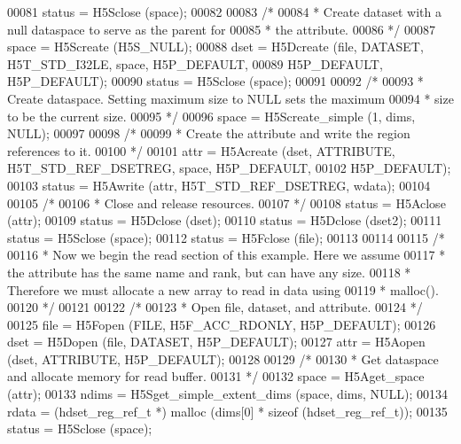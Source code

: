 \begin{DoxyCode}
00081     status = H5Sclose (space);
00082 
00083     \textcolor{comment}{/*}
00084 \textcolor{comment}{     * Create dataset with a null dataspace to serve as the parent for}
00085 \textcolor{comment}{     * the attribute.}
00086 \textcolor{comment}{     */}
00087     space = H5Screate (H5S\_NULL);
00088     dset = H5Dcreate (file, DATASET, H5T\_STD\_I32LE, space, H5P\_DEFAULT,
00089                 H5P\_DEFAULT, H5P\_DEFAULT);
00090     status = H5Sclose (space);
00091 
00092     \textcolor{comment}{/*}
00093 \textcolor{comment}{     * Create dataspace.  Setting maximum size to NULL sets the maximum}
00094 \textcolor{comment}{     * size to be the current size.}
00095 \textcolor{comment}{     */}
00096     space = H5Screate\_simple (1, dims, NULL);
00097 
00098     \textcolor{comment}{/*}
00099 \textcolor{comment}{     * Create the attribute and write the region references to it.}
00100 \textcolor{comment}{     */}
00101     attr = H5Acreate (dset, ATTRIBUTE, H5T\_STD\_REF\_DSETREG, space, H5P\_DEFAULT,
00102                     H5P\_DEFAULT);
00103     status = H5Awrite (attr, H5T\_STD\_REF\_DSETREG, wdata);
00104 
00105     \textcolor{comment}{/*}
00106 \textcolor{comment}{     * Close and release resources.}
00107 \textcolor{comment}{     */}
00108     status = H5Aclose (attr);
00109     status = H5Dclose (dset);
00110     status = H5Dclose (dset2);
00111     status = H5Sclose (space);
00112     status = H5Fclose (file);
00113 
00114 
00115     \textcolor{comment}{/*}
00116 \textcolor{comment}{     * Now we begin the read section of this example.  Here we assume}
00117 \textcolor{comment}{     * the attribute has the same name and rank, but can have any size.}
00118 \textcolor{comment}{     * Therefore we must allocate a new array to read in data using}
00119 \textcolor{comment}{     * malloc().}
00120 \textcolor{comment}{     */}
00121 
00122     \textcolor{comment}{/*}
00123 \textcolor{comment}{     * Open file, dataset, and attribute.}
00124 \textcolor{comment}{     */}
00125     file = H5Fopen (FILE, H5F\_ACC\_RDONLY, H5P\_DEFAULT);
00126     dset = H5Dopen (file, DATASET, H5P\_DEFAULT);
00127     attr = H5Aopen (dset, ATTRIBUTE, H5P\_DEFAULT);
00128 
00129     \textcolor{comment}{/*}
00130 \textcolor{comment}{     * Get dataspace and allocate memory for read buffer.}
00131 \textcolor{comment}{     */}
00132     space = H5Aget\_space (attr);
00133     ndims = H5Sget\_simple\_extent\_dims (space, dims, NULL);
00134     rdata = (hdset\_reg\_ref\_t *) malloc (dims[0] * \textcolor{keyword}{sizeof} (hdset\_reg\_ref\_t));
00135     status = H5Sclose (space);

\end{DoxyCode}
